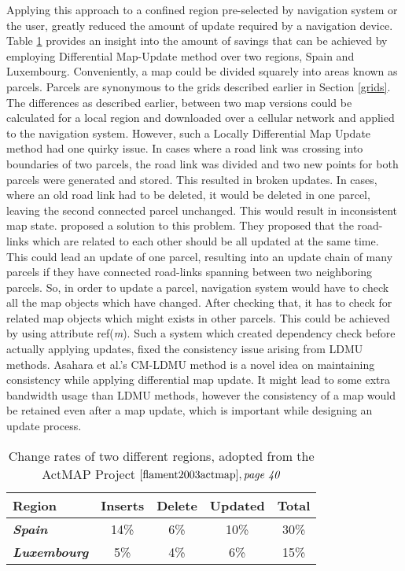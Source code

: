 Applying this approach to a confined region pre-selected by navigation system or the user, greatly reduced the amount of update required by a navigation device. Table \ref{reduction} provides an insight into the amount of savings that can be achieved by employing Differential Map-Update method over two regions, Spain and Luxembourg. Conveniently, a map could be divided squarely into areas known as parcels. Parcels are synonymous to the grids described earlier in Section \ref{grids}. The differences as described earlier, between two map versions could be calculated for a local region and downloaded over a cellular network and applied to the navigation system. However, such a Locally Differential Map Update method had one quirky issue. In cases where a road link was crossing into boundaries of two parcels, the road link was divided and two new points for both parcels were generated and stored. This resulted in broken updates. In cases, where an old road link had to be deleted, it would be deleted in one parcel, leaving the second connected parcel unchanged. This would result in inconsistent map state. \citet{asahara2008locally} proposed a solution to this problem. They proposed that the road-links which are related to each other should be all updated at the same time. This could lead an update of one parcel, resulting into an update chain of many parcels if they have connected road-links spanning between two neighboring parcels. So, in order to update a parcel, navigation system would have to check all the map objects which have changed. After checking that, it has to check for related map objects which might exists in other parcels. This could be achieved by using attribute ref(\textit{m}). Such a system which created dependency check before actually applying updates, fixed the consistency issue arising from LDMU methods. Asahara et al.'s CM-LDMU method is a novel idea on maintaining consistency while applying differential map update. It might lead to some extra bandwidth usage than LDMU methods, however the consistency of a map would be retained even after a map update, which is important while designing an update process.

\begin{table}[]
\centering
\begin{tabular}{|l|c|c|c|c|}
\hline
\textbf{Region}              & \multicolumn{1}{l|}{\textbf{Inserts}} & \multicolumn{1}{l|}{\textbf{Delete}} & \multicolumn{1}{l|}{\textbf{Updated}} & \multicolumn{1}{l|}{\textbf{Total}} \\ \hline
\textit{\textbf{Spain}}      & 14\%                                  & 6\%                                  & 10\%                                  & 30\%                                \\ \hline
\textit{\textbf{Luxembourg}} & 5\%                                   & 4\%                                  & 6\%                                   & 15\%                                \\ \hline
\end{tabular}
\caption{Change rates of two different regions, adopted from the ActMAP Project $\cite{flament2003actmap}, \textit{page 40}$}
\label{reduction}
\end{table}


